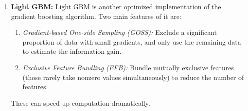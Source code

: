 \documentclass[12pt]{article}
\begin{document}
\begin{enumerate}[label=\textbf{\arabic*.}]
	\item \textbf{Light GBM:} Light GBM is another optimized implementation of the gradient boosting algorithm. Two main features of it are: 
	\begin{enumerate}
		\item \textit{Gradient-based One-side Sampling (GOSS):} Exclude a significant proportion of data with small gradients, and only use the remaining data to estimate the information gain. 
		\item \textit{Exclusive Feature Bundling (EFB):} Bundle mutually exclusive features (those rarely take nonzero values simultaneously) to reduce the number of features. 
	\end{enumerate}
	These can speed up computation dramatically. 
	
\end{enumerate}


\printbibliography
\end{document}
